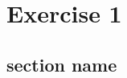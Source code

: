 \graphicspath{{Chapters/Exercise1/}}

\chapter{Exercise 1}

\section{section name} %
\label{sec:section_name}

